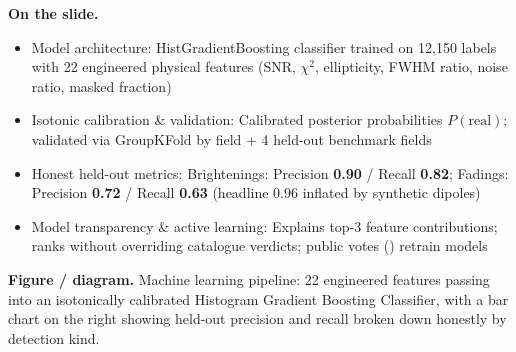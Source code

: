 \documentclass[11pt,a4paper]{article}
\newcommand{\code}[1]{\texttt{\small\detokenize{#1}}}
\begin{document}
\textbf{On the slide.}
\begin{itemize}[leftmargin=1.4em,itemsep=1.5pt,topsep=1.5pt]
\item Model architecture: HistGradientBoosting classifier trained on 12{,}150 labels with 22 engineered physical features (SNR, $\chi^2$, ellipticity, FWHM ratio, noise ratio, masked fraction)
\item Isotonic calibration \& validation: Calibrated posterior probabilities $P(\mathrm{real})$; validated via GroupKFold by field + 4 held-out benchmark fields
\item Honest held-out metrics: Brightenings: Precision \textbf{0.90} / Recall \textbf{0.82}; Fadings: Precision \textbf{0.72} / Recall \textbf{0.63} (headline 0.96 inflated by synthetic dipoles)
\item Model transparency \& active learning: Explains top-3 feature contributions; ranks without overriding catalogue verdicts; public votes (\code{POST /api/votes}) retrain models
\end{itemize}

\textbf{Figure / diagram.} Machine learning pipeline: 22 engineered features passing into an isotonically calibrated Histogram Gradient Boosting Classifier, with a bar chart on the right showing held-out precision and recall broken down honestly by detection kind.
\end{document}

